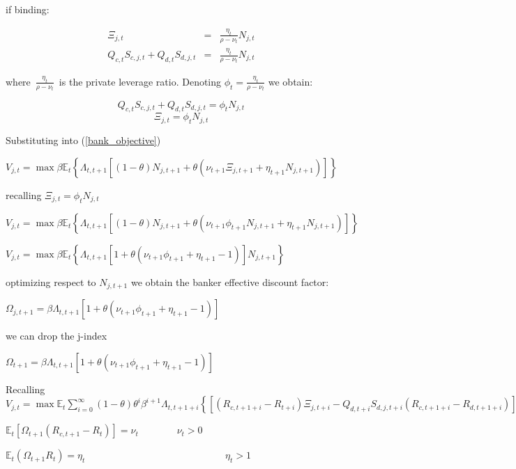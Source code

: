 \documentclass{article}
\begin{document}
if binding:

\begin{eqnarray*}
\Xi _{j,t} &=&\frac{\eta _{t}}{\rho -\nu _{t}}N_{j,t} \\
Q_{c,t}S_{c,j,t}+Q_{d,t}S_{d,j,t} &=&\frac{\eta _{t}}{\rho -\nu _{t}}N_{j,t}
\end{eqnarray*}

where\ $\frac{\eta _{t}}{\rho -\nu _{t}}$\ is the private leverage ratio.
Denoting $\phi _{t}=\frac{\eta _{t}}{\rho -\nu _{t}}$ we obtain:

\begin{equation*}
Q_{c,t}S_{c,j,t}+Q_{d,t}S_{d,j,t}=\phi _{t}N_{j,t}
\end{equation*}%
\begin{equation*}
\Xi _{j,t}=\phi _{t}N_{j,t}
\end{equation*}

Substituting into (\ref{bank_objective})

$V_{j,t}=\max \beta \mathbb{E}_{t}\left\{ \Lambda _{t,t+1}\left[ \left(
1-\theta \right) N_{j,t+1}+\theta (\nu _{t+1}\Xi _{j,t+1}+\eta
_{t+1}N_{j,t+1})\right] \right\} $

recalling $\Xi _{j,t}=\phi _{t}N_{j,t}$

$V_{j,t}=\max \beta \mathbb{E}_{t}\left\{ \Lambda _{t,t+1}\left[ \left(
1-\theta \right) N_{j,t+1}+\theta (\nu _{t+1}\phi _{t+1}N_{j,t+1}+\eta
_{t+1}N_{j,t+1})\right] \right\} $

$V_{j,t}=\max \beta \mathbb{E}_{t}\left\{ \Lambda _{t,t+1}\left[ 1+\theta
(\nu _{t+1}\phi _{t+1}+\eta _{t+1}-1)\right] N_{j,t+1}\right\} $

optimizing respect to $N_{j,t+1}$ we obtain the banker effective discount
factor:

$\Omega _{j,t+1}=\beta \Lambda _{t,t+1}\left[ 1+\theta (\nu _{t+1}\phi
_{t+1}+\eta _{t+1}-1)\right] $

we can drop the j-index

$\Omega _{t+1}=\beta \Lambda _{t,t+1}\left[ 1+\theta (\nu _{t+1}\phi
_{t+1}+\eta _{t+1}-1)\right] $

Recalling $V_{j,t}=\max \mathbb{E}_{t}\sum_{i=0}^{\infty }(1-\theta )\theta
^{i}\beta ^{i+1}\Lambda _{t,t+1+i}\left\{ \left[ (R_{c,t+1+i}-R_{t+i})\Xi
_{j,t+i}-Q_{d,t+i}S_{d,j,t+i}(R_{c,t+1+i}-R_{d,t+1+i})\right]
+R_{t+i}N_{j,t+i}\right\} $

$\mathbb{E}_{t}\left[ \Omega _{t+1}(R_{c,t+1}-R_{t})\right] =\nu _{t}$ \ $\
\ \ \ \ \ \ \ \ \ \ \ \ \ \nu _{t}>0$

$\mathbb{E}_{t}\left( \Omega _{t+1}R_{t}\right) =\eta _{t}$ \ \ \ \ \ \ \ \
\ \ \ \ \ \ \ \ \ \ \ \ \ \ \ \ \ \ \ \ $\eta _{t}>1$
\end{document}
